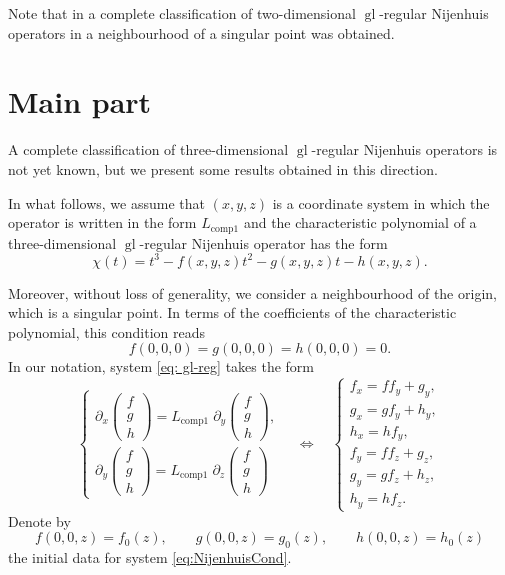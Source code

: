 \documentclass[10pt,a4paper]{amsart}
\begin{document}
Note that in \cite{bolsinov2024nijenhuisNGIII} a complete classification of two-dimensional $\operatorname{gl}$-regular Nijenhuis operators in a neighbourhood of a singular point was obtained.


\section*{Main part}

A complete classification of three-dimensional $\operatorname{gl}$-regular Nijenhuis operators is not yet known, but we present some results obtained in this direction.

In what follows, we assume that $(x,y,z)$ is a coordinate system in which the operator is written in the form $L_{\operatorname{comp1}}$ and the characteristic polynomial of a three-dimensional $\operatorname{gl}$-regular Nijenhuis operator has the form
\begin{equation}\label{eq: char pol}
    \chi(t) = t^3 - f(x,y,z)t^2 - g(x,y,z)t - h(x,y,z).
\end{equation}

Moreover, without loss of generality, we consider a neighbourhood of the origin, which is a singular point. In terms of the coefficients of the characteristic polynomial, this condition reads
\[
f(0,0,0)=g(0,0,0)=h(0,0,0)=0.
\]
In our notation, system \eqref{eq: gl-reg} takes the form
\begin{equation}\label{eq:NijenhuisCond}
    \begin{cases}
        \partial_x \begin{pmatrix} f \\ g \\ h \end{pmatrix}
        = L_{\operatorname{comp1}} \; \partial_y \begin{pmatrix} f \\ g \\ h \end{pmatrix},
        \\[2ex]
        \partial_y \begin{pmatrix} f \\ g \\ h \end{pmatrix}
        = L_{\operatorname{comp1}} \; \partial_z \begin{pmatrix} f \\ g \\ h \end{pmatrix}
    \end{cases}
    \quad\Longleftrightarrow\quad
    \begin{cases}
        f_x = f f_y + g_y,\\
        g_x = g f_y + h_y,\\
        h_x = h f_y,\\[2ex]
        f_y = f f_z + g_z,\\
        g_y = g f_z + h_z,\\
        h_y = h f_z.
    \end{cases}
\end{equation}
Denote by
\[
f(0,0,z)=f_0(z), \qquad
g(0,0,z)=g_0(z), \qquad
h(0,0,z)=h_0(z)
\]
the initial data for system \eqref{eq:NijenhuisCond}.
\end{document}

